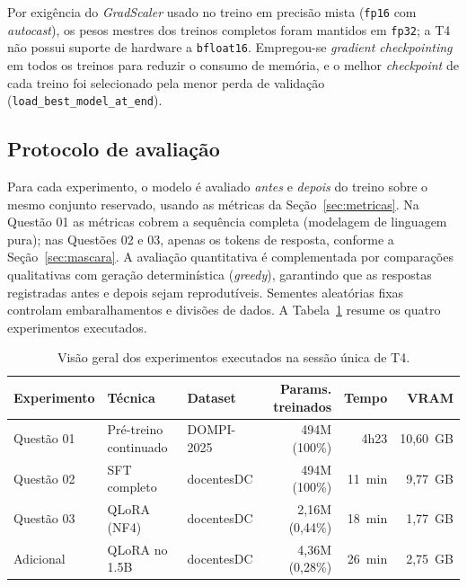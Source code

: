Por exigência do \textit{GradScaler} usado no treino em precisão mista
(\texttt{fp16} com \textit{autocast}), os pesos mestres dos treinos completos foram
mantidos em \texttt{fp32}; a T4 não possui suporte de hardware a \texttt{bfloat16}.
Empregou-se \textit{gradient checkpointing} em todos os treinos para reduzir o
consumo de memória, e o melhor \textit{checkpoint} de cada treino foi selecionado
pela menor perda de validação (\texttt{load\_best\_model\_at\_end}).

\subsection{Protocolo de avaliação}

Para cada experimento, o modelo é avaliado \emph{antes} e \emph{depois} do treino
sobre o mesmo conjunto reservado, usando as métricas da Seção~\ref{sec:metricas}. Na
Questão 01 as métricas cobrem a sequência completa (modelagem de linguagem pura);
nas Questões 02 e 03, apenas os tokens de resposta, conforme a
Seção~\ref{sec:mascara}. A avaliação quantitativa é complementada por comparações
qualitativas com geração determinística (\textit{greedy}), garantindo que as
respostas registradas antes e depois sejam reprodutíveis. Sementes aleatórias fixas
controlam embaralhamentos e divisões de dados. A Tabela~\ref{tab:visao-geral} resume
os quatro experimentos executados.

\begin{table}[ht]
  \centering
  \caption{Visão geral dos experimentos executados na sessão única de T4.}
  \label{tab:visao-geral}
  \footnotesize
  \begin{tabular}{@{}l l l r r r@{}}
    \toprule
    \textbf{Experimento} & \textbf{Técnica} & \textbf{Dataset} & \textbf{Params. treinados} & \textbf{Tempo} & \textbf{VRAM} \\
    \midrule
    Questão 01 & Pré-treino continuado & DOMPI-2025 & 494M (100\%) & 4h23 & 10,60~GB \\
    Questão 02 & SFT completo          & docentesDC & 494M (100\%) & 11~min & 9,77~GB \\
    Questão 03 & QLoRA (NF4)           & docentesDC & 2,16M (0,44\%) & 18~min & 1,77~GB \\
    Adicional  & QLoRA no 1.5B         & docentesDC & 4,36M (0,28\%) & 26~min & 2,75~GB \\
    \bottomrule
  \end{tabular}
\end{table}


